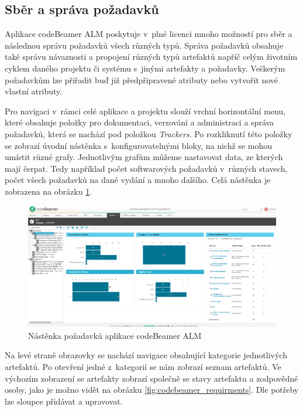 \documentclass[czech,master]{diploma}
\begin{document}
\subsection{Sběr a správa požadavků}
Aplikace codeBeamer ALM poskytuje v~plné licenci mnoho možností pro sběr a následnou správu požadavků všech různých typů. Správa požadavků obsahuje také správu návaznosti a propojení různých typů artefaktů napříč celým životním cyklem daného projektu či systému s~jinými artefakty a požadavky. Veškerým požadavkům lze přiřadit buď již předpřipravené atributy nebo vytvořit nové vlastní atributy.

Pro navigaci v~rámci celé aplikace a projektu slouží vrchní horizontální menu, které obsahuje položky pro dokumentaci, verzování a administraci a správa požadavků, která se nachází pod položkou \textit{Trackers}. Po rozkliknutí této položky se zobrazí úvodní nástěnka s~konfigurovatelnými bloky, na nichž se mohou umístit různé grafy. Jednotlivým grafům můžeme nastavovat data, ze kterých mají čerpat. Tedy například počet softwarových požadavků v~různých stavech, počet všech požadavků na dané vydání a mnoho dalšího. Celá nástěnka je zobrazena na obrázku \ref{fig:codebeamer_trackers}.

\begin{figure}[!ht]
    \centering
    \includegraphics[width=1\textwidth]{Diplomka/Figures/codebeamer_trackers.png}
    \caption{Nástěnka požadavků aplikace codeBeamer ALM}
    \label{fig:codebeamer_trackers}
\end{figure}

Na levé straně obrazovky se nachází navigace obsahující kategorie jednotlivých artefaktů. Po otevření jedné z~kategorií se nám zobrazí seznam artefaktů. Ve výchozím zobrazení se artefakty zobrazí společně se stavy artefaktu a zodpovědné osoby, jako je možno vidět na obrázku \ref{fig:codebeamer_requirments}. Dle potřeby lze sloupce přidávat a upravovat.
\end{document}
